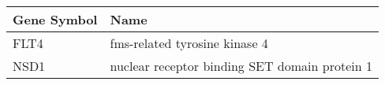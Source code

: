 \begin{tabular}{ll}
\toprule
Gene Symbol &                                          Name \\
\midrule
       FLT4 &                 fms-related tyrosine kinase 4 \\
       NSD1 & nuclear receptor binding SET domain protein 1 \\
\bottomrule
\end{tabular}

